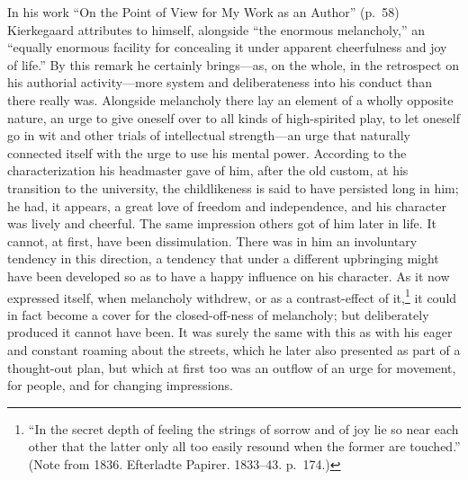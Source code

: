 \documentclass[12pt,a4paper]{book}
\newcommand{\opage}[1]{\marginnote{\footnotesize\textit{[#1]}}}
\begin{document}
In his work ``On the Point of View for My Work as an Author'' (p.~58)
Kierkegaard attributes to himself, alongside ``the enormous melancholy,''
an ``equally enormous facility for concealing it under apparent
cheerfulness and joy of life.'' By this remark he certainly brings---as,
on the whole, in the retrospect on his authorial activity---more system
and deliberateness into his conduct than there really was. Alongside
melancholy there lay an element of a wholly opposite nature, an urge to
give oneself over to all kinds of high-spirited play, to let oneself go
in wit and other trials of intellectual strength---an urge that naturally
connected itself with the urge to use his mental power. According to the
characterization his headmaster gave of him, after the old custom, at his
transition to the university, the childlikeness is said to have persisted
long in him; he had, it appears, a great love of freedom and
independence, and his character was lively and cheerful. The same
impression others got of him later in life. It cannot, at first, have
been dissimulation. There was in him an involuntary tendency in this
direction, a tendency that under a different upbringing might have been
developed so as to have a happy influence on his character. As it now
expressed itself, when melancholy withdrew,
\opage{34}or as a contrast-effect of it,\footnote{``In the secret depth of
feeling the strings of sorrow and of joy lie so near each other that the
latter only all too easily resound when the former are touched.'' (Note
from 1836. Efterladte Papirer. 1833--43. p.~174.)} it could in fact
become a cover for the closed-off-ness of melancholy; but deliberately
produced it cannot have been. It was surely the same with this as with
his eager and constant roaming about the streets, which he later also
presented as part of a thought-out plan, but which at first too was an
outflow of an urge for movement, for people, and for changing
impressions.
\end{document}
